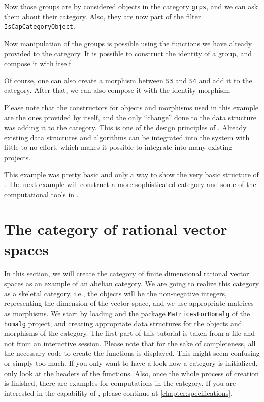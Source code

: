 

Now those groups are by \CapPkg considered objects in the category \texttt{grps}, and we can
ask them about their category. Also, they are now part of the \GAP filter \texttt{IsCapCategoryObject}.



Now manipulation of the groups is possible using the functions we have already provided to the category.
It is possible to construct the identity of a group, and compose it with itself.



Of course, one can also create a morphism between \texttt{S3} and \texttt{S4} and add it to the category.
After that, we can also compose it with the identity morphism.



Please note that the constructors for objects and morphisms used in this example are the ones provided
by \GAP itself, and the only ``change'' done to the data structure was adding it to the category.
This is one of the design principles of \CapPkg. Already existing data structures and algorithms
can be integrated into the system with little to no effort, which makes it possible to integrate \CapPkg
into many existing projects.

This example was pretty basic and only a way to show the very basic structure of \CapPkg. The next example
will construct a more sophisticated category and some of the computational tools in \CapPkg.


\section{The category of rational vector spaces}

In this section, we will create the category of finite dimensional rational vector spaces as an
example of an abelian category. We are going
to realize this category as a skeletal category, i.e., the objects will be the non-negative integers,
representing the dimension of the vector space, and we use appropriate matrices as morphisms. We start
by loading \CapPkg and the package \texttt{MatricesForHomalg} of the \texttt{homalg} project, and creating appropriate data structures
for the objects and morphisms of the category. The first part of this tutorial is taken from a file and not from
an interactive session. Please note that for the sake of completeness, all the necessary code to create the
functions is displayed. This might seem confusing or simply too much. If you only want to have a look how a \CapPkg category
is initialized, only look at the headers of the functions. Also, once the whole process of creation is finished,
there are examples for computations in the category. If you are interested in the capability of \CapPkg, please
continue at \ref{chapter:specifications}. %

